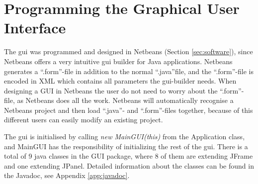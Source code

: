 \section{Programming the Graphical User Interface}
\label{secr:proggui}
The \acrshort{gui} was programmed and designed in Netbeans (Section \ref{sec:software}), since Netbeans offers a very intuitive \acrshort{gui} builder for Java applications. Netbeans generates a ``.form''-file in addition to the normal ``.java''file, and the ``.form''-file is encoded in XML which contains all parameters the \acrshort{gui}-builder needs. When designing a GUI in Netbeans the user do not need to worry about the ``.form''-file, as Netbeans does all the work. Netbeans will automatically recognise a Netbeans project and then load ``.java''- and ``.form''-files together, because of this different users can easily modify an existing project.

The \acrshort{gui} is initialised by calling \textit{new MainGUI(this)} from the Application class, and MainGUI has the responsibility of initializing the rest of the \acrshort{gui}. There is a total of 9 java classes in the GUI package, where 8 of them are extending JFrame and one extending JPanel. Detailed information about the classes can be found in the Javadoc, see Appendix \ref{app:javadoc}.